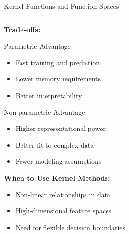 \documentclass[8pt,aspectratio=1610]{beamer}
\begin{document}
\begin{frame}{Kernel Functions and Function Spaces}
\begin{columns}[t]
\begin{column}{0.48\textwidth}
\vspace{0.3cm}
\textbf{Trade-offs:}

\begin{block}{Parametric Advantage}
\begin{itemize}
\setlength{\itemsep}{1pt}
\item Fast training and prediction
\item Lower memory requirements
\item Better interpretability
\end{itemize}
\end{block}

\begin{block}{Non-parametric Advantage}
\begin{itemize}
\setlength{\itemsep}{1pt}
\item Higher representational power
\item Better fit to complex data
\item Fewer modeling assumptions
\end{itemize}
\end{block}

\vspace{0.3cm}
\textbf{When to Use Kernel Methods:}
\begin{itemize}
\setlength{\itemsep}{1pt}
\item Non-linear relationships in data
\item High-dimensional feature spaces
\item Need for flexible decision boundaries
\end{itemize}
\end{column}
\end{columns}
\end{frame}
\end{document}
